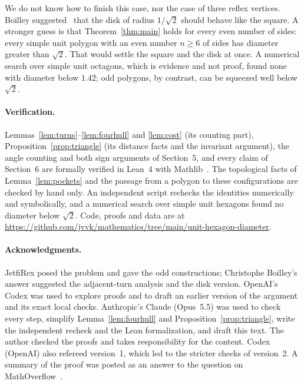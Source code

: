 \documentclass[11pt]{article}
\theoremstyle{remark}
\begin{document}
We do not know how to finish this case, nor the case of three reflex vertices. Boilley
suggested~\cite{Boilley} that the disk of radius $1/\sqrt2$ should behave like the square.
A stronger guess is that Theorem~\ref{thm:main} holds for every even number of sides: every
simple unit polygon with an even number $n\ge6$ of sides has diameter greater than $\sqrt2$.
That would settle the square and the disk at once. A numerical search over simple unit
octagons, which is evidence and not proof, found none with diameter below $1.42$; odd
polygons, by contrast, can be squeezed well below $\sqrt2$.

\paragraph{Verification.} Lemmas~\ref{lem:turns}--\ref{lem:fourhull} and \ref{lem:cost}
(its counting part), Proposition~\ref{prop:triangle} (its distance facts and the invariant
argument), the angle counting and both sign arguments of Section~5, and every claim of
Section~6 are formally verified in Lean~4 with Mathlib~\cite{mathlib}. The topological facts of
Lemma~\ref{lem:pockets} and the passage from a polygon to these configurations are checked
by hand only. An independent script rechecks the identities numerically and symbolically,
and a numerical search over simple unit hexagons found no diameter below $\sqrt2$. Code,
proofs and data are at \url{https://github.com/jvvk/mathematics/tree/main/unit-hexagon-diameter}.

\paragraph{Acknowledgments.} JetfiRex posed the problem and gave the odd constructions;
Christophe Boilley's answer suggested the adjacent-turn analysis and the disk version.
OpenAI's Codex was used to explore proofs and to draft an earlier version of the argument and
its exact local checks. Anthropic's Claude (Opus~5.5) was used to check every step,
simplify Lemma~\ref{lem:fourhull} and Proposition~\ref{prop:triangle}, write the
independent recheck and the Lean formalization, and draft this text. The author checked
the proofs and takes responsibility for the content. Codex (OpenAI) also refereed version~1, which led
to the stricter checks of version~2. A summary of the proof was posted as an answer to the question
on MathOverflow~\cite{OwnMO}.
\end{document}
